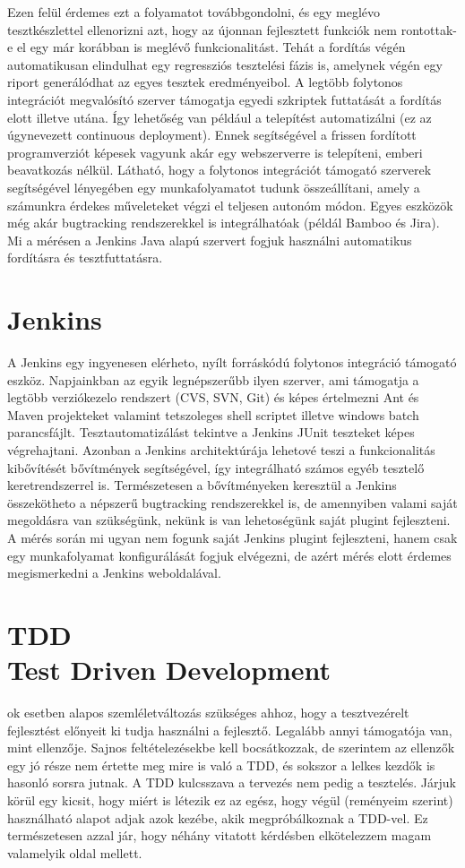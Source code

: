 Ezen felül érdemes ezt a folyamatot továbbgondolni, és egy meglévo tesztkészlettel ellenorizni azt, hogy az újonnan fejlesztett funkciók nem rontottak-e el egy már korábban is meglévő funkcionalitást. Tehát a fordítás végén automatikusan elindulhat egy regressziós tesztelési fázis is, amelynek végén egy riport generálódhat az egyes tesztek eredményeibol.
A legtöbb folytonos integrációt megvalósító szerver támogatja egyedi szkriptek futtatását a
fordítás elott illetve utána. Így lehetőség van például a telepítést automatizálni (ez az úgynevezett continuous deployment). Ennek segítségével a frissen fordított programverziót képesek vagyunk akár egy webszerverre is telepíteni, emberi beavatkozás nélkül.
Látható, hogy a folytonos integrációt támogató szerverek segítségével lényegében egy munkafolyamatot tudunk összeállítani, amely a számunkra érdekes műveleteket végzi el teljesen autonóm módon. Egyes eszközök még akár bugtracking rendszerekkel is integrálhatóak (példál
Bamboo és Jira). Mi a mérésen a Jenkins Java alapú szervert fogjuk használni automatikus fordításra és tesztfuttatásra.

\section{Jenkins}
A Jenkins egy ingyenesen elérheto, nyílt forráskódú folytonos integráció támogató eszköz. Napjainkban az egyik legnépszerűbb ilyen szerver, ami támogatja a legtöbb verziókezelo rendszert (CVS, SVN, Git) és képes értelmezni Ant és Maven projekteket valamint tetszoleges shell scriptet illetve windows batch parancsfájlt. Tesztautomatizálást tekintve a Jenkins JUnit teszteket képes végrehajtani. Azonban a Jenkins architektúrája lehetové teszi a funkcionalitás kibővítését bővítmények segítségével, így integrálható számos egyéb tesztelő keretrendszerrel is. 
Természetesen a bővítményeken keresztül a Jenkins összekötheto a népszerű bugtracking rendszerekkel is, de amennyiben valami saját megoldásra van szükségünk, nekünk is van lehetoségünk saját plugint fejleszteni. A mérés során mi ugyan nem fogunk saját Jenkins plugint fejleszteni, hanem csak egy munkafolyamat konfigurálását fogjuk elvégezni, de azért mérés elott érdemes megismerkedni a Jenkins weboldalával.

\section{TDD\\\small{Test Driven Development}}
ok esetben alapos szemléletváltozás szükséges ahhoz, hogy a tesztvezérelt fejlesztést előnyeit ki tudja használni a fejlesztő. Legalább annyi támogatója van, mint ellenzője. Sajnos feltételezésekbe kell bocsátkozzak, de szerintem az ellenzők egy jó része nem értette meg mire is való a TDD, és sokszor a lelkes kezdők is hasonló sorsra jutnak. A TDD kulcsszava a tervezés nem pedig a tesztelés. Járjuk körül egy kicsit, hogy miért is létezik ez az egész, hogy végül (reményeim szerint) használható alapot adjak azok kezébe, akik megpróbálkoznak a TDD-vel. Ez természetesen azzal jár, hogy néhány vitatott kérdésben elkötelezzem magam valamelyik oldal mellett.

